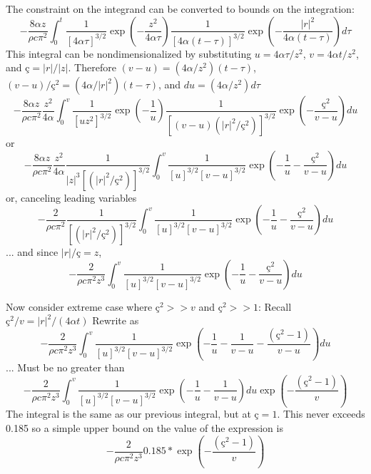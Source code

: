 \documentclass[letterpaper]{article}
\newcommand{\cedilla}{\text{\c{c}}}
\begin{document}
The constraint on the integrand can be converted to bounds on the integration:
\begin{equation}
-\frac{8\alpha z}{\rho c\pi^{2}} \int_{0}^{t}\frac{1}{\left[4\alpha\tau\right]^{3/2}}\exp\left(-\frac{z^{2}}{4\alpha\tau}\right)\frac{1}{\left[4\alpha(t-\tau)\right]^{3/2}}\exp\left(-\frac{|r|^{2}}{4\alpha(t-\tau)}\right) d\tau
\end{equation}
This integral can be nondimensionalized by substituting $u=4\alpha\tau/z^{2}$, $v=4\alpha t/z^{2}$,  and $\cedilla=|r|/|z|$. Therefore
$(v-u)=(4\alpha/z^{2})(t-\tau)$, $(v-u)/\cedilla^{2}=(4\alpha/|r|^{2})(t-\tau)$,
and $du=(4\alpha/z^{2})d\tau$
\begin{equation}
-\frac{8\alpha z}{\rho c\pi^{2}}\frac{z^{2}}{4\alpha}\int_{0}^{v}\frac{1}{\left[uz^{2}\right]^{3/2}}\exp\left(-\frac{1}{u}\right) \frac{1}{\left[(v-u)(|r|^{2}/\cedilla^{2})\right]^{3/2}}\exp\left(-\frac{\cedilla^{2}}{v-u}\right) du
\end{equation}
or 
\begin{equation}
-\frac{8\alpha z}{\rho c\pi^{2}}\frac{z^{2}}{4\alpha}\frac{1}{|z|^{3}\left[(|r|^{2}/\cedilla^{2})\right]^{3/2}}\int_{0}^{v}\frac{1}{\left[u\right]^{3/2}\left[v-u\right]^{3/2}}\exp\left(-\frac{1}{u}-\frac{\cedilla^{2}}{v-u}\right) du
\end{equation}
or, canceling leading variables
\begin{equation}
-\frac{2}{\rho c\pi^{2}}  \frac{1}{\left[(|r|^{2}/\cedilla^{2})\right]^{3/2}}\int_{0}^{v}\frac{1}{\left[u\right]^{3/2}\left[v-u\right]^{3/2}}\exp\left(-\frac{1}{u}-\frac{\cedilla^{2}}{v-u}\right) du
\end{equation}
... and since $|r|/\cedilla = z$,
\begin{equation}
-\frac{2}{\rho c\pi^{2}z^{3}} \int_{0}^{v}\frac{1}{\left[u\right]^{3/2}\left[v-u\right]^{3/2}}\exp\left(-\frac{1}{u}-\frac{\cedilla^{2}}{v-u}\right) du
\end{equation}


Now consider extreme case where $\cedilla^{2} >>  v$ and $\cedilla^{2} >> 1$:
Recall $\cedilla^{2}/v = |r|^{2}/(4\alpha t)$
Rewrite as 
\begin{equation}
-\frac{2}{\rho c\pi^{2}z^{3}} \int_{0}^{v}\frac{1}{\left[u\right]^{3/2}\left[v-u\right]^{3/2}}\exp\left(-\frac{1}{u}-\frac{1}{v-u}-\frac{(\cedilla^{2}-1)}{v-u}\right) du
\end{equation}
... Must be no greater than
\begin{equation}
-\frac{2}{\rho c\pi^{2}z^{3}} \int_{0}^{v}\frac{1}{\left[u\right]^{3/2}\left[v-u\right]^{3/2}}\exp\left(-\frac{1}{u}-\frac{1}{v-u}\right) du \exp\left(-\frac{(\cedilla^{2}-1)}{v}\right)
\end{equation}
The integral is the same as our previous integral,
but at $\cedilla=1$. This never exceeds 0.185
so a simple upper bound on the value of the expression is
\begin{equation}
-\frac{2}{\rho c\pi^{2}z^{3}}0.185*\exp\left(-\frac{(\cedilla^{2}-1)}{v}\right)
\end{equation}
\end{document}
